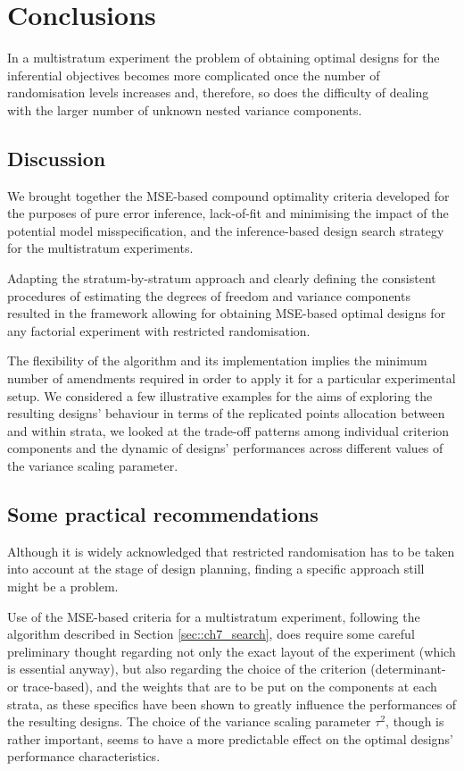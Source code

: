 \section{Conclusions}

In a multistratum experiment the problem of obtaining optimal designs for the inferential objectives becomes more complicated once the number of randomisation levels increases and, therefore, so does the difficulty of dealing with the larger number of unknown nested variance components. 

\subsection{Discussion}
We brought together the MSE-based compound optimality criteria developed for the purposes of pure error inference, lack-of-fit and minimising the impact of the potential model misspecification, and the inference-based design search strategy for the multistratum experiments. 

Adapting the stratum-by-stratum approach and clearly defining the consistent procedures of estimating the degrees of freedom and variance components resulted in the framework allowing for obtaining MSE-based optimal designs for any factorial experiment with restricted randomisation.

The flexibility of the algorithm and its implementation implies the minimum number of amendments required in order to apply it for a particular experimental setup. We considered a few illustrative examples for the aims of exploring the resulting designs' behaviour in terms of the replicated points allocation between and within strata, we looked at the trade-off patterns among individual criterion components and the dynamic of designs' performances across different values of the variance scaling parameter.


\subsection{Some practical recommendations}

Although it is widely acknowledged that restricted randomisation has to be taken into account at the stage of design planning, finding a specific approach still might be a problem. 
 
Use of the MSE-based criteria for a multistratum experiment, following the algorithm described in Section \ref{sec::ch7_search}, does require some careful preliminary thought regarding not only the exact layout of the experiment (which is essential anyway), but also regarding the choice of the criterion (determinant- or trace-based), and the weights that are to be put on the components at each strata, as these specifics have been shown to greatly influence the performances of the resulting designs. The choice of the variance scaling parameter $\tau^2$, though is rather important, seems to have a more predictable effect on the optimal designs' performance characteristics.


